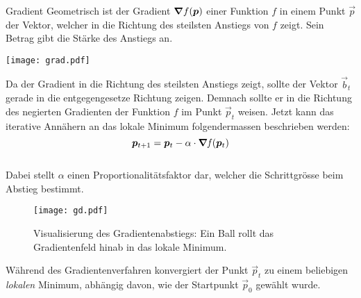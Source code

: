 \begin{appendices}
\begin{defbox}{Gradient}
  Geometrisch ist der Gradient $\bm{\nabla}f(\bm{p})$ einer Funktion $f$ in
  einem Punkt $\vec{p}$ der Vektor, welcher in die Richtung des steilsten
  Anstiegs von $f$ zeigt. Sein Betrag gibt die Stärke des Anstiegs an.
  \para{}
  \begin{center}
    \texttt{[image: grad.pdf]}
  \end{center}
\end{defbox}
\para{}
Da der Gradient in die Richtung des steilsten Anstiegs zeigt, sollte der Vektor
$\vec{b}_t$ gerade in die entgegengesetze Richtung zeigen. Demnach sollte er in die Richtung des negierten Gradienten der Funktion $f$ im Punkt $\vec{p}_t$ weisen.
Jetzt kann das iterative Annähern an das lokale Minimum folgendermassen beschrieben
werden:
\\
\begin{equation}\label{eq:gradientdescent}
  \bm{p}_{t+1} = \bm{p}_t - \alpha \cdot \bm{\nabla} \mathit{f}(\bm{p}_t)
\end{equation}
\\
Dabei stellt $\alpha$ einen Proportionalitätsfaktor dar, welcher die
Schrittgrösse beim Abstieg bestimmt.

\ifcp%
\begin{figure}[h!]
  \centering
  \texttt{[image: gd.pdf]}
  \caption{Visualisierung des Gradientenabstiegs: Ein Ball rollt das
    Gradientenfeld hinab in das lokale Minimum.}
\end{figure}
\fi%

Während des Gradientenverfahren konvergiert der Punkt $\vec{p}_t$ zu einem
beliebigen \textit{lokalen} Minimum, abhängig davon, wie der Startpunkt
$\vec{p}_0$ gewählt wurde.

\cite{book:hands-on}
\cite{Nielsen}


\end{appendices}
